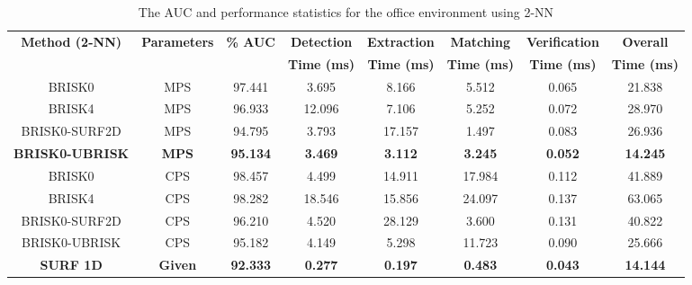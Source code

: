 \documentclass{report}
\begin{document}
\begin{table}
\caption{The AUC and performance statistics for the office environment using
2-NN}
\footnotesize
\begin{tabular}{|c|c|c|c|c|c|c|c|}
\hline 
\textbf{Method (2-NN)} & \textbf{Parameters} & \textbf{\% AUC} & \textbf{Detection} & \textbf{Extraction} & \textbf{Matching} & \textbf{Verification} & \textbf{Overall}\tabularnewline
 &  &  & \textbf{Time (ms)} & \textbf{Time (ms)} & \textbf{Time (ms)} & \textbf{Time (ms)} & \textbf{Time (ms)}\tabularnewline
\hline 
\hline 
BRISK0 & MPS & 97.441 & 3.695 & 8.166 & 5.512 & 0.065 & 21.838\tabularnewline
\hline 
BRISK4 & MPS & 96.933 & 12.096 & 7.106 & 5.252 & 0.072 & 28.970\tabularnewline
\hline 
BRISK0-SURF2D & MPS & 94.795 & 3.793 & 17.157 & 1.497 & 0.083 & 26.936\tabularnewline
\hline 
\textbf{BRISK0-UBRISK} & \textbf{MPS} & \textbf{95.134} & \textbf{3.469} & \textbf{3.112} & \textbf{3.245} & \textbf{0.052} & \textbf{14.245}\tabularnewline
\hline 
BRISK0 & CPS & 98.457 & 4.499 & 14.911 & 17.984 & 0.112 & 41.889\tabularnewline
\hline 
BRISK4 & CPS & 98.282 & 18.546 & 15.856 & 24.097 & 0.137 & 63.065\tabularnewline
\hline 
BRISK0-SURF2D & CPS & 96.210 & 4.520 & 28.129 & 3.600 & 0.131 & 40.822\tabularnewline
\hline 
BRISK0-UBRISK & CPS & 95.182 & 4.149 & 5.298 & 11.723 & 0.090 & 25.666\tabularnewline
\hline 
\textbf{SURF 1D} & \textbf{Given} & \textbf{92.333} & \textbf{0.277} & \textbf{0.197} & \textbf{0.483} & \textbf{0.043} & \textbf{14.144}\tabularnewline
\hline 
\end{tabular}
\label{tab:rocTimingOfficeKnn}
\end{table}
\end{document}
